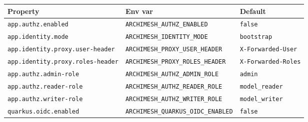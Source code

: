 \begin{longtable}{p{46mm}p{54mm}p{54mm}}
\toprule
Property & Env var & Default \\
\midrule
\texttt{app.authz.enabled} & \texttt{ARCHIMESH\_AUTHZ\_ENABLED} &
  \texttt{false} \\
\texttt{app.identity.mode} & \texttt{ARCHIMESH\_IDENTITY\_MODE} &
  \texttt{bootstrap} \\
\texttt{app.identity.proxy.user-header} &
  \texttt{ARCHIMESH\_PROXY\_USER\_HEADER} &
  \texttt{X-Forwarded-User} \\
\texttt{app.identity.proxy.roles-header} &
  \texttt{ARCHIMESH\_PROXY\_ROLES\_HEADER} &
  \texttt{X-Forwarded-Roles} \\
\texttt{app.authz.admin-role} & \texttt{ARCHIMESH\_AUTHZ\_ADMIN\_ROLE} &
  \texttt{admin} \\
\texttt{app.authz.reader-role} & \texttt{ARCHIMESH\_AUTHZ\_READER\_ROLE} &
  \texttt{model\_reader} \\
\texttt{app.authz.writer-role} & \texttt{ARCHIMESH\_AUTHZ\_WRITER\_ROLE} &
  \texttt{model\_writer} \\
\texttt{quarkus.oidc.enabled} & \texttt{ARCHIMESH\_QUARKUS\_OIDC\_ENABLED} &
  \texttt{false} \\
\bottomrule
\end{longtable}
